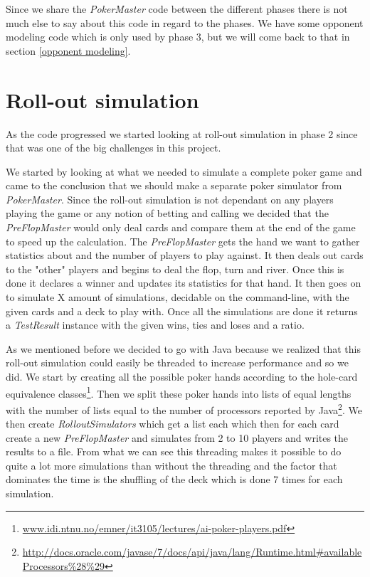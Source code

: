 \documentclass[titlepage, a4paper]{article}
\begin{document}
Since we share the \textit{PokerMaster} code between the different phases there
is not much else to say about this code in regard to the phases. We have some
opponent modeling code which is only used by phase 3, but we will come back to that
in section \ref{opponent modeling}.

\section{Roll-out simulation}\label{roll-out simulation}
As the code progressed we started looking at roll-out simulation in phase 2 since
that was one of the big challenges in this project.

We started by looking at what we needed to simulate a complete poker game and came
to the conclusion that we should make a separate poker simulator from \textit{PokerMaster}.
Since the roll-out simulation is not dependant on any players playing the game
or any notion of betting and calling we decided that the \textit{PreFlopMaster}
would only deal cards and compare them at the end of the game to speed up the 
calculation. The \textit{PreFlopMaster} gets the hand we want to gather statistics
about and the number of players to play against. It then deals out cards to the
"other" players and begins to deal the flop, turn and river. Once this is done
it declares a winner and updates its statistics for that hand. It then goes on to
simulate X amount of simulations, decidable on the command-line, with the given cards
and a deck to play with. Once all the simulations are done it returns a
\textit{TestResult} instance with the given wins, ties and loses and a ratio.

As we mentioned before we decided to go with Java because we realized that this roll-out
simulation could easily be threaded to increase performance and so we did. We
start by creating all the possible poker hands according to the hole-card equivalence
classes\footnote{\url{www.idi.ntnu.no/emner/it3105/lectures/ai-poker-players.pdf}}.
Then we split these poker hands into lists of equal lengths with the number of
lists equal to the number of processors reported by Java\footnote{\url{http://docs.oracle.com/javase/7/docs/api/java/lang/Runtime.html\#availableProcessors\%28\%29}}.
We then create \textit{RolloutSimulators} which get a list each which then for each
card create a new \textit{PreFlopMaster} and simulates from 2 to 10 players and
writes the results to a file. From what we can see this threading makes it possible
to do quite a lot more simulations than without the threading and the factor
that dominates the time is the shuffling of the deck which is done 7 times for
each simulation.
\end{document}

